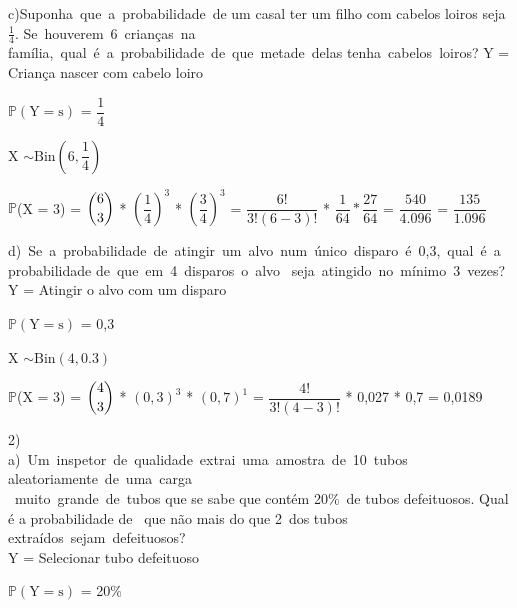 \documentclass[12pt,a4paper,draft]{article}
\begin{document}
	\vspace{1cm}
	c)Suponha que a probabilidade de um casal ter um filho com cabelos loiros seja $\frac{1}{4}$. Se houverem 6 crianças na  família, qual é a probabilidade de que metade delas tenha cabelos loiros?
	\vspace{0.5cm}
	Y = Criança nascer com cabelo loiro
	\begin{center}
		\vspace{1cm}
		$\mathbb{P}\left(\text{Y} = \text{s}\right)$ = $\dfrac{1}{4}$
		\vspace{1cm}\\
	\end{center}
	X $\sim \text{Bin}\left(6, \dfrac{1}{4}\right)$
	\vspace{1cm}\\
	\begin{center}
		$\mathbb{P}$(X = 3) = $\dbinom{6}{3}$ * $\left(\dfrac{1}{4}\right)^3$ * $\left(\dfrac{3}{4}\right)^3$ = $\dfrac{6!}{3!(6-3)!}$ * $\dfrac{1}{64} * \dfrac{27}{64}$ = $\dfrac{540}{4.096}$ = $\dfrac{135}{1.096}$
	\end{center}
	\vspace{1cm}
	d) Se a probabilidade de atingir um alvo num único disparo é 0,3, qual é a probabilidade de que em 4 disparos o alvo  seja atingido no mínimo 3 vezes?
	\vspace{0.5cm}
	Y = Atingir o alvo com um disparo
	\begin{center}
		\vspace{1cm}
		$\mathbb{P}\left(\text{Y} = \text{s}\right)$ = 0,3
	\end{center}
	\vspace{1cm}
	X $\sim \text{Bin}(4, 0.3)$
	\begin{center}
		\vspace{1cm}
		$\mathbb{P}$(X = 3) = $\dbinom{4}{3}$ * $\left(0,3\right)^3$ * $\left(0,7\right)^1$ = $\dfrac{4!}{3!(4-3)!}$ * 0,027 * 0,7 = 0,0189
	\end{center}
	\vspace{1cm}
	2)\\
	a) Um inspetor de qualidade extrai uma amostra de 10 tubos aleatoriamente de uma carga\\ muito grande de tubos que se sabe que contém 20\% de tubos defeituosos. Qual é a probabilidade de  que não mais do que 2 dos tubos	extraídos sejam defeituosos?
	\vspace{0.5cm}\\
	Y = Selecionar tubo defeituoso
	\begin{center}
		\vspace{1cm}
		$\mathbb{P}\left(\text{Y} = \text{s}\right)$ = 20\%
		\vspace{1cm}\\
	\end{center}
\end{document}
